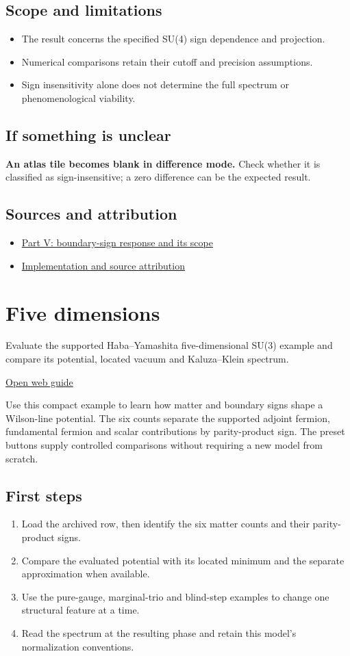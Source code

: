 \documentclass[11pt,a4paper]{article}
\begin{document}
\subsection*{Scope and limitations}
\begin{itemize}
\item The result concerns the specified SU(4) sign dependence and projection.
\item Numerical comparisons retain their cutoff and precision assumptions.
\item Sign insensitivity alone does not determine the full spectrum or phenomenological viability.
\end{itemize}
\subsection*{If something is unclear}
\textbf{An atlas tile becomes blank in difference mode.} Check whether it is classified as sign-insensitive; a zero difference can be the expected result.

\subsection*{Sources and attribution}
\begin{itemize}
\item \href{https://karlesmarin.github.io/ghu-explorer/papers/part-v/index.html}{Part V: boundary-sign response and its scope}
\item \href{https://github.com/karlesmarin/ghu-lab/blob/main/src/sections/eta_section.js}{Implementation and source attribution}
\end{itemize}
\section{Five dimensions}
Evaluate the supported Haba--Yamashita five-dimensional SU(3) example and compare its potential, located vacuum and Kaluza--Klein spectrum.

\href{https://karlesmarin.github.io/ghu-explorer/guide/fived/index.html}{Open web guide}

Use this compact example to learn how matter and boundary signs shape a Wilson-line potential. The six counts separate the supported adjoint fermion, fundamental fermion and scalar contributions by parity-product sign. The preset buttons supply controlled comparisons without requiring a new model from scratch.
\subsection*{First steps}
\begin{enumerate}
\item Load the archived row, then identify the six matter counts and their parity-product signs.
\item Compare the evaluated potential with its located minimum and the separate approximation when available.
\item Use the pure-gauge, marginal-trio and blind-step examples to change one structural feature at a time.
\item Read the spectrum at the resulting phase and retain this model's normalization conventions.
\end{enumerate}
\end{document}

